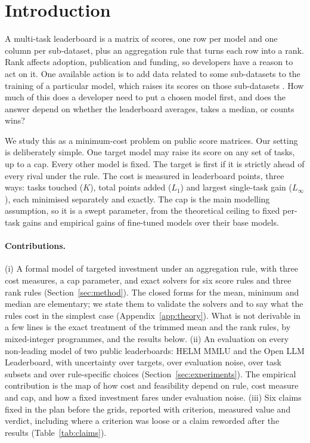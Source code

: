 \section{Introduction}
A multi-task leaderboard is a matrix of scores, one row per model and one column per sub-dataset, plus an aggregation rule that turns each row into a rank.
Rank affects adoption, publication and funding, so developers have a reason to act on it.
One available action is to add data related to some sub-datasets to the training of a particular model, which raises its scores on those sub-datasets \citep{zhou2023dont,yang2023rephrased}.
How much of this does a developer need to put a chosen model first, and does the answer depend on whether the leaderboard averages, takes a median, or counts wins?

We study this as a minimum-cost problem on public score matrices.
Our setting is deliberately simple. One target model may raise its score on any set of tasks, up to a cap. Every other model is fixed. The target is first if it is strictly ahead of every rival under the rule.
The cost is measured in leaderboard points, three ways: tasks touched ($K$), total points added ($L_1$) and largest single-task gain ($L_\infty$), each minimised separately and exactly. The cap is the main modelling assumption, so it is a swept parameter, from the theoretical ceiling to fixed per-task gains and empirical gains of fine-tuned models over their base models.

\paragraph{Contributions.}
(i) A formal model of targeted investment under an aggregation rule, with three cost measures, a cap parameter, and exact solvers for six score rules and three rank rules (Section~\ref{sec:method}). The closed forms for the mean, minimum and median are elementary; we state them to validate the solvers and to say what the rules cost in the simplest case (Appendix~\ref{app:theory}). What is not derivable in a few lines is the exact treatment of the trimmed mean and the rank rules, by mixed-integer programmes, and the results below.
(ii) An evaluation on every non-leading model of two public leaderboards: HELM MMLU \citep{liang2022holistic,hendrycks2021measuring} and the Open LLM Leaderboard, with uncertainty over targets, over evaluation noise, over task subsets and over rule-specific choices (Section~\ref{sec:experiments}). The empirical contribution is the map of how cost and feasibility depend on rule, cost measure and cap, and how a fixed investment fares under evaluation noise.
(iii) Six claims fixed in the plan before the grids, reported with criterion, measured value and verdict, including where a criterion was loose or a claim reworded after the results (Table~\ref{tab:claims}).

